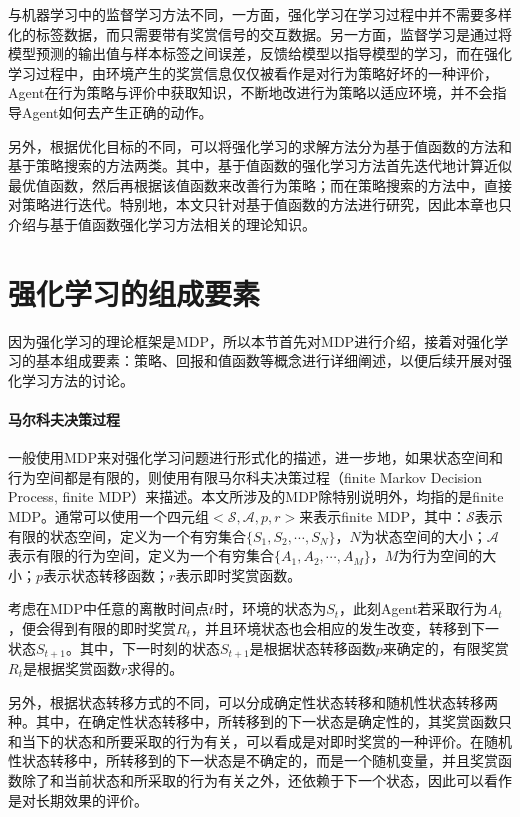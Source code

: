  与机器学习中的监督学习方法不同，一方面，强化学习在学习过程中并不需要多样化的标签数据，而只需要带有奖赏信号的交互数据。另一方面，监督学习是通过将模型预测的输出值与样本标签之间误差，反馈给模型以指导模型的学习，而在强化学习过程中，由环境产生的奖赏信息仅仅被看作是对行为策略好坏的一种评价，Agent在行为策略与评价中获取知识，不断地改进行为策略以适应环境，并不会指导Agent如何去产生正确的动作。

 另外，根据优化目标的不同，可以将强化学习的求解方法分为基于值函数的方法和基于策略搜索的方法两类。其中，基于值函数的强化学习方法首先迭代地计算近似最优值函数，然后再根据该值函数来改善行为策略；而在策略搜索的方法中，直接对策略进行迭代。特别地，本文只针对基于值函数的方法进行研究，因此本章也只介绍与基于值函数强化学习方法相关的理论知识。

\section{强化学习的组成要素}
因为强化学习的理论框架是MDP，所以本节首先对MDP进行介绍，接着对强化学习的基本组成要素：策略、回报和值函数等概念进行详细阐述，以便后续开展对强化学习方法的讨论。

\paragraph{马尔科夫决策过程}
一般使用MDP来对强化学习问题进行形式化的描述，进一步地，如果状态空间和行为空间都是有限的，则使用有限马尔科夫决策过程（finite Markov Decision Process, finite MDP）来描述\citep{2016连续空间强化学习研究}。本文所涉及的MDP除特别说明外，均指的是finite MDP。通常可以使用一个四元组$<\mathcal{S},\mathcal{A},p,r>$来表示finite MDP，其中：$\mathcal{S}$表示有限的状态空间，定义为一个有穷集合$\{ S_1,S_2,\cdots ,S_N \}$，$N$为状态空间的大小；$\mathcal{A}$表示有限的行为空间，定义为一个有穷集合$\{ A_1,A_2,\cdots ,A_M \}$，$M$为行为空间的大小；$p$表示状态转移函数；$r$表示即时奖赏函数。

考虑在MDP中任意的离散时间点$t$时，环境的状态为$S_{t}$，此刻Agent若采取行为$A_{t}$，便会得到有限的即时奖赏$R_{t}$，并且环境状态也会相应的发生改变，转移到下一状态$S_{t+1}$。其中，下一时刻的状态$S_{t+1}$是根据状态转移函数$p$来确定的，有限奖赏$R_{t}$是根据奖赏函数$r$求得的。

另外，根据状态转移方式的不同，可以分成确定性状态转移和随机性状态转移两种。其中，在确定性状态转移中，所转移到的下一状态是确定性的，其奖赏函数只和当下的状态和所要采取的行为有关，可以看成是对即时奖赏的一种评价。在随机性状态转移中，所转移到的下一状态是不确定的，而是一个随机变量，并且奖赏函数除了和当前状态和所采取的行为有关之外，还依赖于下一个状态，因此可以看作是对长期效果的评价。

